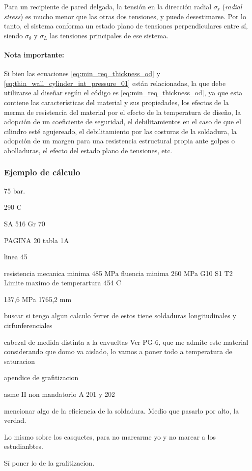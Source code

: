 Para un recipiente de pared delgada, la tensión en la dirección radial $\sigma_{r}$ (\textit{radial stress}) es mucho menor que las otras dos tensiones, y puede desestimarse. Por lo tanto, el sistema conforma un estado plano de tensiones perpendiculares entre sí, siendo $\sigma_{\theta}$ y $\sigma_L$ las tensiones principales de ese sistema.

\paragraph{Nota importante:} Si bien las ecuaciones \ref{eq:min_req_thickness_od} y \ref{eq:thin_wall_cylinder_int_pressure_01} están relacionadas, la que debe utilizarse al diseñar según el código es \ref{eq:min_req_thickness_od}, ya que esta contiene las características del material y sus propiedades, los efectos de la merma de resistencia del material por el efecto de la temperatura de diseño, la adopción de un coeficiente de seguridad, el debilitamientos en el caso de que el cilindro esté agujereado, el debilitamiento por las costuras de la soldadura, la adopción de un margen para una resistencia estructural propia ante golpes o abolladuras, el efecto del estado plano de tensiones, etc. 

\subsubsection{Ejemplo de cálculo}

75 bar.

290 C

SA 516 Gr 70

PAGINA 20 tabla 1A

linea 45

resistencia mecanica minima 485 MPa
fluencia minima 260 MPa
G10 S1 T2
Limite maximo de temperartura 454 C


137,6 MPa
1765,2 mm

buscar si tengo algun calculo ferrer de estos
tiene soldaduras longitudinales y cirfunferenciales

cabezal de medida distinta a la envueltas
Ver PG-6, que me admite este material
considerando que domo va aislado, lo vamos a poner todo a temperatura de saturacion

apendice de grafitizacion

asme II non mandatorio A 201 y 202

mencionar algo de la eficiencia de la soldadura. Medio que pasarlo por alto, la verdad.

Lo mismo sobre los casquetes, para no marearme yo y no marear a los estudianbtes.

Sí poner lo de la grafitizacion.






